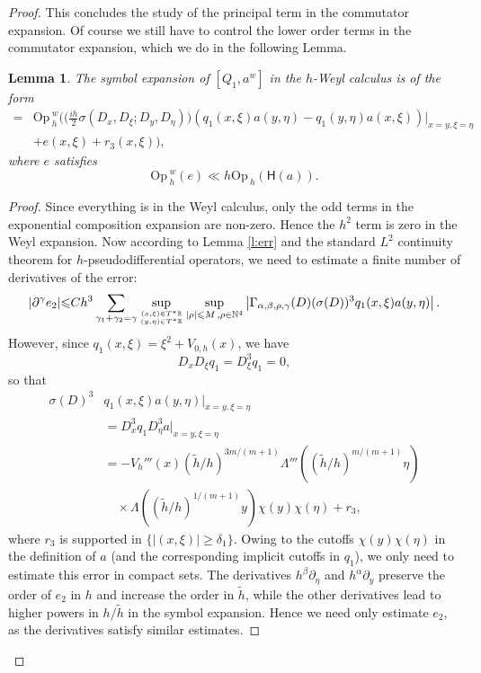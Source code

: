 \documentclass[twoside, final]{amsart}
\newtheorem{lemma}[proposition]{Lemma}
\theoremstyle{definition}
\numberwithin{equation}{section}
\begin{document}
\begin{proof}
This concludes the study of the principal term in the commutator
expansion.  Of course we still have to control the lower order terms
in the commutator expansion, which we do in the following Lemma.

\begin{lemma}
\label{L:Q-comm-error-3a}
The symbol expansion of $[Q_1, a^w]$ in the $h$-Weyl calculus is of
the form
\begin{align*}
[Q_1, a^w] = & {\mathrm{Op}\,}_h^w \Bigg( \Big( 
\frac{i h}{2} \sigma ( D_x , D_\xi; D_y , D_\eta) \Big) (q_1(x, \xi)
a(y, \eta) - q_1(y, \eta) a ( x , \xi) ) |_{ x = y , \xi = \eta} \\
& + e (
x, \xi ) + r_3(x, \xi)\Bigg) ,
\end{align*}
where $e$ satisfies
\[
{\mathrm{Op}\,}_h^w(e)  
\ll h {\mathrm{Op}\,}_h({{\textsf{H}}} (a)).
\]

\end{lemma}

\begin{proof}
Since everything is in the Weyl calculus, only the odd terms in the
exponential composition expansion are non-zero.  Hence the $h^2$ term
is zero in the Weyl expansion.  
Now according to Lemma \ref{l:err} and the standard $L^2$ continuity
theorem for $h$-pseudodifferential operators, we need to estimate a
finite number of 
derivatives of the error:
\begin{equation}
\label{E:error-10001}
 | \partial^{\gamma} e_2 | {\leqslant} C h^{3}
\sum_{ \gamma_1 + \gamma_2 = \gamma } 
 \sup_{ 
{{( x, \xi) \in T^* {\mathbb{R}} }
\atop{ ( y , \eta) \in T^* {\mathbb{R}} }}} \sup_{
|\rho | {\leqslant} M  \,, \rho \in {{\mathbb N}}^{4} }
\left|
\Gamma_{\alpha, \beta, \rho, \gamma}(D)
( \sigma ( D) ) ^{3} q_1 ( x , \xi)  
a ( y, \eta ) 
\right| 
.
\end{equation}
However, since $q_1(x, \xi) = \xi^2 + V_{0,h}(x)$, we have
\[
D_x D_\xi q_1 = D_{\xi}^3 q_1 = 0,
\]
so that
\begin{align*}
\sigma(D)^3 & q_1(x, \xi) a(y, \eta) |_{ x = y , \xi = \eta} \\
& = D_x^3 q_1 D_\eta^3 a |_{ x = y , \xi = \eta} \\
& = -V_h'''(x) ({\tilde{h}}/h)^{3m/(m+1)} \Lambda'''
(({\tilde{h}}/h)^{m/(m+1)} \eta) \\
& \quad \times \Lambda(({\tilde{h}}/h)^{1/(m+1)} y) \chi(y)
\chi(\eta)
+ r_3,
\end{align*}
where $r_3$ is supported in $\{ | (x, \xi) | {\geqslant} \delta_1 \}$.  
Owing to the cutoffs $\chi(y) \chi(\eta)$ in the definition of $a$
(and the corresponding implicit cutoffs in $q_1$), we only need to
estimate this error in compact sets.  The derivatives
$h^{\beta} \partial_\eta$ and $h^\alpha \partial_y$
preserve the order of $e_2$ in $h$ and increase the order in ${\tilde{h}}$, while the other derivatives lead
to higher powers in $h/{\tilde{h}}$ in the symbol expansion.  Hence we need only estimate $e_2$,
as the derivatives satisfy similar estimates.


\end{proof}
\end{proof}
\end{document}
